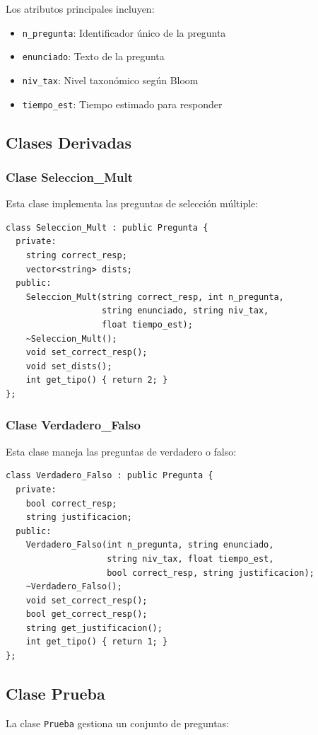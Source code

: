 \documentclass[12pt]{article}
\begin{document}
Los atributos principales incluyen:
\begin{itemize}
    \item \texttt{n\_pregunta}: Identificador \'unico de la pregunta
    \item \texttt{enunciado}: Texto de la pregunta
    \item \texttt{niv\_tax}: Nivel taxon\'omico seg\'un Bloom
    \item \texttt{tiempo\_est}: Tiempo estimado para responder
\end{itemize}

\subsection{Clases Derivadas}

\subsubsection{Clase Seleccion\_Mult}
Esta clase implementa las preguntas de selecci\'on m\'ultiple:

\begin{lstlisting}[style=customc]
class Seleccion_Mult : public Pregunta {  
  private:
    string correct_resp;
    vector<string> dists;
  public:
    Seleccion_Mult(string correct_resp, int n_pregunta, 
                   string enunciado, string niv_tax, 
                   float tiempo_est);
    ~Seleccion_Mult();
    void set_correct_resp();
    void set_dists();
    int get_tipo() { return 2; }
};
\end{lstlisting}

\subsubsection{Clase Verdadero\_Falso}
Esta clase maneja las preguntas de verdadero o falso:

\begin{lstlisting}[style=customc]
class Verdadero_Falso : public Pregunta {
  private:
    bool correct_resp;
    string justificacion;
  public:
    Verdadero_Falso(int n_pregunta, string enunciado, 
                    string niv_tax, float tiempo_est,
                    bool correct_resp, string justificacion);
    ~Verdadero_Falso();
    void set_correct_resp();
    bool get_correct_resp();
    string get_justificacion();
    int get_tipo() { return 1; }
};
\end{lstlisting}

\subsection{Clase Prueba}
La clase \texttt{Prueba} gestiona un conjunto de preguntas:
\end{document}
